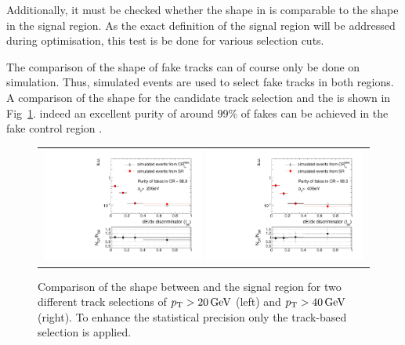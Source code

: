 Additionally, it must be checked whether the \ias shape in \fakeCR is comparable to the \ias shape in the signal region.
As the exact definition of the signal region will be addressed during optimisation, this test is be done for various \pt selection cuts.

The comparison of the \ias shape of fake tracks can of course only be done on simulation.
Thus, simulated \WJets events are used to select fake tracks in both regions.
A comparison of the shape for the candidate track selection and the \fakeCR is shown in Fig~\ref{fig:IasSRCRFakes}.
indeed an excellent purity of around 99\% of fakes can be achieved in the \ias fake control region \fakeCR.


\begin{figure}[!t]
  \centering 
  \begin{tabular}{c}
    \includegraphics[width=0.49\textwidth]{figures/analysis/Background/hASmi_fakes_ECalaoLe5_trackPtGt20.pdf}
    \includegraphics[width=0.49\textwidth]{figures/analysis/Background/hASmi_fakes_ECalaoLe5_trackPtGt40.pdf}
  \end{tabular}
  \caption{Comparison of the \ias shape between \fakeCR and the signal region for two different track \pt selections of $p_{\text{T}}>20\,\text{Ge}\kern-0.06667em\text{V}$ (left) and $p_{\text{T}}>40\,\text{Ge}\kern-0.06667em\text{V}$ (right). To enhance the statistical precision only the track-based selection is applied.}
  \label{fig:IasSRCRFakes}
\end{figure}

